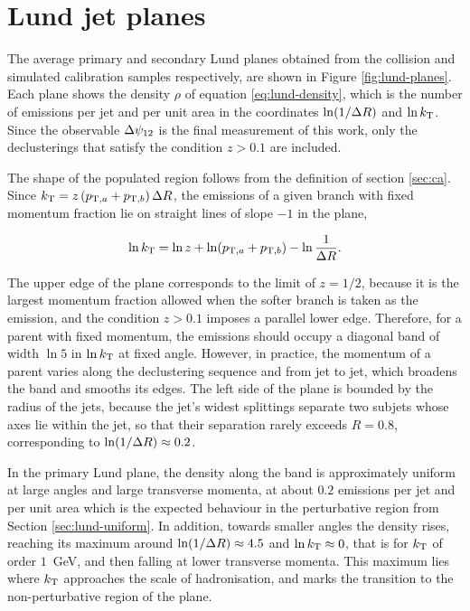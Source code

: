 \section{Lund jet planes}
\label{sec:res-lund}

The average primary and secondary Lund planes obtained from the collision and simulated calibration samples respectively,
are shown in Figure \ref{fig:lund-planes}. Each plane shows the density $\rho$ of equation \eqref{eq:lund-density},
which is the number of emissions per jet and per unit area in
the coordinates $\ln(1/\Delta R)$ and $\ln k_{\mathrm{T}}$. Since the observable $\Delta\psi_{12}$ is the final measurement
of this work, only the declusterings that satisfy the condition $z > 0.1$ are included.

The shape of the populated region follows from the definition of section \ref{sec:ca}.
Since $k_{\mathrm{T}} = z\,(p_{\mathrm{T},a} + p_{\mathrm{T},b})\,\Delta R$,
the emissions of a given branch with fixed momentum fraction lie on straight lines
of slope $-1$ in the plane,

\begin{equation}
  \ln k_{\mathrm{T}} = \ln z + \ln\!\left( p_{\mathrm{T},a} + p_{\mathrm{T},b} \right)
            - \ln\frac{1}{\Delta R} .
  \label{eq:lund-zlines}
\end{equation}

The upper edge of the plane corresponds to the limit of $z=1/2$, because it is the largest
momentum fraction allowed when the softer branch is taken as the emission, and the
condition $z > 0.1$ imposes a parallel lower edge. Therefore, for a parent with
fixed momentum, the emissions should occupy a diagonal band of width $\ln 5$ in $\ln k_{\mathrm{T}}$
at fixed angle. However, in practice, the momentum of a parent varies along the
declustering sequence and from jet to jet, which broadens the band and smooths its
edges. The left side of the plane is bounded by the radius of the jets, because the jet's 
widest splittings separate two subjets whose axes lie within the jet, so that their
separation rarely exceeds $R = 0.8$, corresponding to $\ln(1/\Delta R) \approx 0.2$.

In the primary Lund plane, the density along the band is approximately 
uniform at large angles and large transverse momenta, at about $0.2$ emissions per jet and per
unit area which is the expected behaviour in the perturbative region from Section \ref{sec:lund-uniform}.
In addition, towards smaller angles the density rises, reaching its maximum 
around $\ln(1/\Delta R) \approx 4.5$ and $\ln k_{\mathrm{T}} \approx 0$, that
is for $k_{\mathrm{T}}$ of order $1$~GeV, and then falling at lower transverse momenta. 
This maximum lies where $k_{\mathrm{T}}$ approaches the scale of hadronisation, and marks the
transition to the non-perturbative region of the plane.

